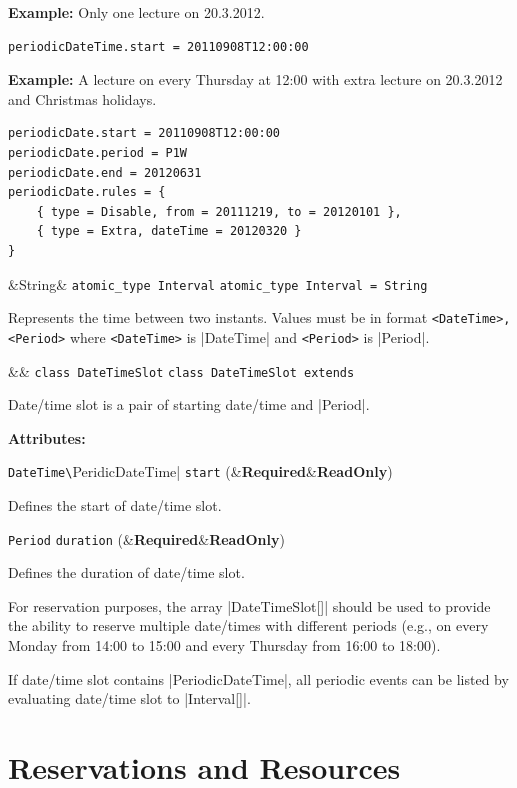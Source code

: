 \documentclass[a4paper]{report}
\newenvironment{Api}{\begin{itemize}}{\end{itemize}}
\newcommand{\ApiCode}[1]{\lstinline[style=styleApi]|#1|}
\newcommand{\ApiValue}[1]{\verb|#1|}
\newcommand{\ApiItem}[1]{\item #1 %

}
\newcommand{\ApiType}[2]{\ApiItem{%
  \ifx&#2& \ApiCode{atomic_type #1} \else \ApiCode{atomic_type #1 = #2} \fi}%
}
\newcommand{\ApiClass}[2]{\ApiItem{%
  \ifx&#2& \ApiCode{class #1} \else \ApiCode{class #1 extends #2} \fi}%
}
\newenvironment{ApiClassAttributes}{%

\begin{samepage}\textbf{Attributes:}\begin{compactitem}}{\end{compactitem}\end{samepage}}
\newcommand{\ApiRequired}{{\color{blue!50!black}\textbf{Required}}}
\newcommand{\ApiReadOnly}{{\color{red!50!black}\textbf{ReadOnly}}}
\newcommand{\ApiClassAttribute}[3]{\ApiItem{\ApiCode{#2} \ApiCode{#1} \hspace{1mm}(\ifx&#3&\ApiReadOnly\else#3\fi)
}}
\newcommand{\ApiExample}{%

\textbf{Example:}
}
\begin{document}
\begin{Api}
\ApiExample Only one lecture on 20.3.2012.
\begin{verbatim}
periodicDateTime.start = 20110908T12:00:00
\end{verbatim}

\ApiExample A lecture on every Thursday at 12:00 with extra lecture on 20.3.2012 and Christmas holidays.
\begin{verbatim}
periodicDate.start = 20110908T12:00:00
periodicDate.period = P1W
periodicDate.end = 20120631
periodicDate.rules = {
    { type = Disable, from = 20111219, to = 20120101 },
    { type = Extra, dateTime = 20120320 }
}
\end{verbatim}

\ApiType{Interval}{String}
Represents the time between two instants. Values must be in format \ApiValue{<DateTime>,<Period>} where \ApiValue{<DateTime>} is |DateTime| and \ApiValue{<Period>} is |Period|.

\ApiClass{DateTimeSlot}{}
Date/time slot is a pair of starting date/time and |Period|.
\begin{ApiClassAttributes}
\ApiClassAttribute{start}{DateTime\|PeridicDateTime}{\ApiRequired}
Defines the start of date/time slot.
\ApiClassAttribute{duration}{Period}{\ApiRequired}
Defines the duration of date/time slot.
\end{ApiClassAttributes}

For reservation purposes, the array |DateTimeSlot[]| should be used to provide the ability to reserve multiple date/times with different periods (e.g., on every Monday from 14:00 to 15:00 and every Thursday from 16:00 to 18:00).

If date/time slot contains |PeriodicDateTime|, all periodic events can be listed by evaluating date/time slot to |Interval[]|.

\end{Api}


\section{Reservations and Resources} \label{sect:common:reservations-resources}
\end{document}
